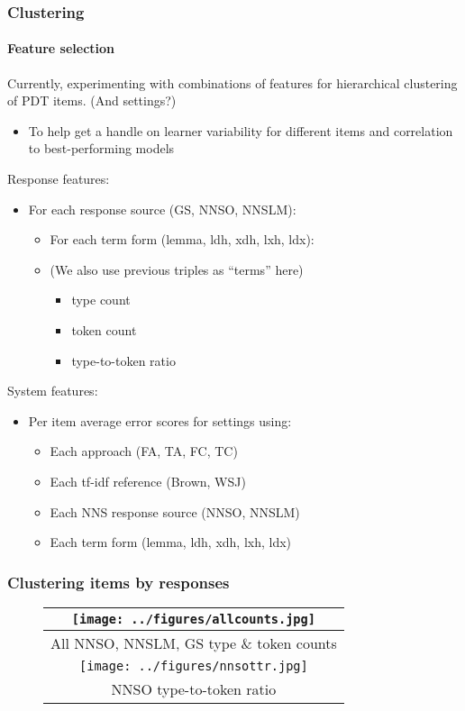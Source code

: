 \documentclass{beamer}
\begin{document}
\begin{frame}[noframenumbering]
\frametitle{Clustering}
\framesubtitle{Feature selection}
Currently, experimenting with combinations of features for hierarchical clustering of PDT items. (And settings?)
\begin{itemize}
\item To help get a handle on learner variability for different items and correlation to best-performing models
\end{itemize}
\medskip
Response features:
\begin{itemize}
\item{For each response source (GS, NNSO, NNSLM):}
\begin{itemize}
\item{For each term form (lemma, ldh, xdh, lxh, ldx):}
\item{(We also use previous triples as ``terms'' here)}
\begin{itemize}
\item{type count}
\item{token count}
\item{type-to-token ratio}
\end{itemize}
\end{itemize}
\end{itemize}

\medskip
System features:
\begin{itemize}
\item{Per item average error scores for settings using:}
\begin{itemize}
\item{Each approach (FA, TA, FC, TC)}
\item{Each tf-idf reference (Brown, WSJ)}
\item{Each NNS response source (NNSO, NNSLM)}
\item{Each term form (lemma, ldh, xdh, lxh, ldx)}
\end{itemize}
\end{itemize}

\end{frame}

\begin{frame}[noframenumbering]
\frametitle{Clustering items by responses}
\footnotesize
\begin{figure}[width=0.9\columnwidth]
\begin{center}
\begin{tabular}{|c|}
\hline
\texttt{[image: ../figures/allcounts.jpg]} \\
\hline
All NNSO, NNSLM, GS type \& token counts\\
\hline
\hline
\texttt{[image: ../figures/nnsottr.jpg]} \\
\hline
NNSO type-to-token ratio \\
\hline
\end{tabular}
\end{center}
\end{figure}
\end{frame}
\end{document}
